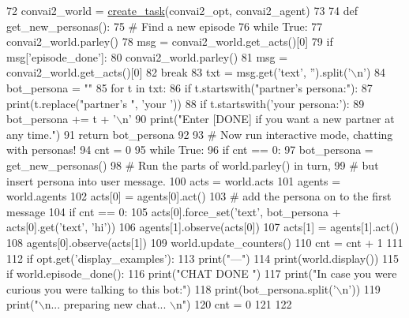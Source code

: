 \begin{DoxyCode}
72     convai2\_world = \hyperlink{namespaceparlai_1_1core_1_1worlds_a79969c7ba76d4b3c500f5bb776444dc6}{create\_task}(convai2\_opt, convai2\_agent)
73 
74     \textcolor{keyword}{def }get\_new\_personas():
75         \textcolor{comment}{# Find a new episode}
76         \textcolor{keywordflow}{while} \textcolor{keyword}{True}:
77             convai2\_world.parley()
78             msg = convai2\_world.get\_acts()[0]
79             \textcolor{keywordflow}{if} msg[\textcolor{stringliteral}{'episode\_done'}]:
80                 convai2\_world.parley()
81                 msg = convai2\_world.get\_acts()[0]
82                 \textcolor{keywordflow}{break}
83         txt = msg.get(\textcolor{stringliteral}{'text'}, \textcolor{stringliteral}{''}).split(\textcolor{stringliteral}{'\(\backslash\)n'})
84         bot\_persona = \textcolor{stringliteral}{""}
85         \textcolor{keywordflow}{for} t \textcolor{keywordflow}{in} txt:
86             \textcolor{keywordflow}{if} t.startswith(\textcolor{stringliteral}{"partner's persona:"}):
87                 print(t.replace(\textcolor{stringliteral}{"partner's "}, \textcolor{stringliteral}{'your '}))
88             \textcolor{keywordflow}{if} t.startswith(\textcolor{stringliteral}{'your persona:'}):
89                 bot\_persona += t + \textcolor{stringliteral}{'\(\backslash\)n'}
90         print(\textcolor{stringliteral}{"Enter [DONE] if you want a new partner at any time."})
91         \textcolor{keywordflow}{return} bot\_persona
92 
93     \textcolor{comment}{# Now run interactive mode, chatting with personas!}
94     cnt = 0
95     \textcolor{keywordflow}{while} \textcolor{keyword}{True}:
96         \textcolor{keywordflow}{if} cnt == 0:
97             bot\_persona = get\_new\_personas()
98         \textcolor{comment}{# Run the parts of world.parley() in turn,}
99         \textcolor{comment}{# but insert persona into user message.}
100         acts = world.acts
101         agents = world.agents
102         acts[0] = agents[0].act()
103         \textcolor{comment}{# add the persona on to the first message}
104         \textcolor{keywordflow}{if} cnt == 0:
105             acts[0].force\_set(\textcolor{stringliteral}{'text'}, bot\_persona + acts[0].get(\textcolor{stringliteral}{'text'}, \textcolor{stringliteral}{'hi'}))
106         agents[1].observe(acts[0])
107         acts[1] = agents[1].act()
108         agents[0].observe(acts[1])
109         world.update\_counters()
110         cnt = cnt + 1
111 
112         \textcolor{keywordflow}{if} opt.get(\textcolor{stringliteral}{'display\_examples'}):
113             print(\textcolor{stringliteral}{"---"})
114             print(world.display())
115         \textcolor{keywordflow}{if} world.episode\_done():
116             print(\textcolor{stringliteral}{"CHAT DONE "})
117             print(\textcolor{stringliteral}{"In case you were curious you were talking to this bot:"})
118             print(bot\_persona.split(\textcolor{stringliteral}{'\(\backslash\)n'}))
119             print(\textcolor{stringliteral}{"\(\backslash\)n... preparing new chat... \(\backslash\)n"})
120             cnt = 0
121 
122 
\end{DoxyCode}
